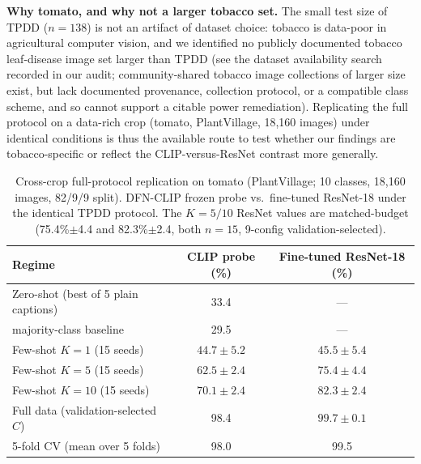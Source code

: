 \documentclass[10pt,a4paper]{article}
\begin{document}
\textbf{Why tomato, and why not a larger tobacco set.} The small test size of TPDD ($n{=}138$) is not an artifact of dataset choice: tobacco is data-poor in agricultural computer vision, and we identified no publicly documented tobacco leaf-disease image set larger than TPDD (see the dataset availability search recorded in our audit; community-shared tobacco image collections of larger size exist, but lack documented provenance, collection protocol, or a compatible class scheme, and so cannot support a citable power remediation). Replicating the full protocol on a data-rich crop (tomato, PlantVillage, 18{,}160 images) under identical conditions is thus the available route to test whether our findings are tobacco-specific or reflect the CLIP-versus-ResNet contrast more generally.

\begin{table}[!ht]
\centering
\caption{Cross-crop full-protocol replication on tomato (PlantVillage; 10 classes, 18{,}160 images, 82/9/9 split). DFN-CLIP frozen probe vs.\ fine-tuned ResNet-18 under the identical TPDD protocol. The $K{=}5/10$ ResNet values are matched-budget (75.4\%$\pm$4.4 and 82.3\%$\pm$2.4, both $n{=}15$, 9-config validation-selected).}
\label{tab:tomato}
\begin{tabular}{lcc}
\toprule
\textbf{Regime} & \textbf{CLIP probe (\%)} & \textbf{Fine-tuned ResNet-18 (\%)} \\
\midrule
Zero-shot (best of 5 plain captions) & 33.4 & --- \\
\quad majority-class baseline       & 29.5 & --- \\
Few-shot $K{=}1$  (15 seeds) & $44.7\pm5.2$ & $45.5\pm5.4$ \\
Few-shot $K{=}5$  (15 seeds) & $62.5\pm2.4$ & $75.4\pm4.4$ \\
Few-shot $K{=}10$ (15 seeds) & $70.1\pm2.4$ & $82.3\pm2.4$ \\
Full data (validation-selected $C$) & 98.4 & $99.7\pm0.1$ \\
5-fold CV (mean over 5 folds) & 98.0 & 99.5 \\
\bottomrule
\end{tabular}
\end{table}
\end{document}
